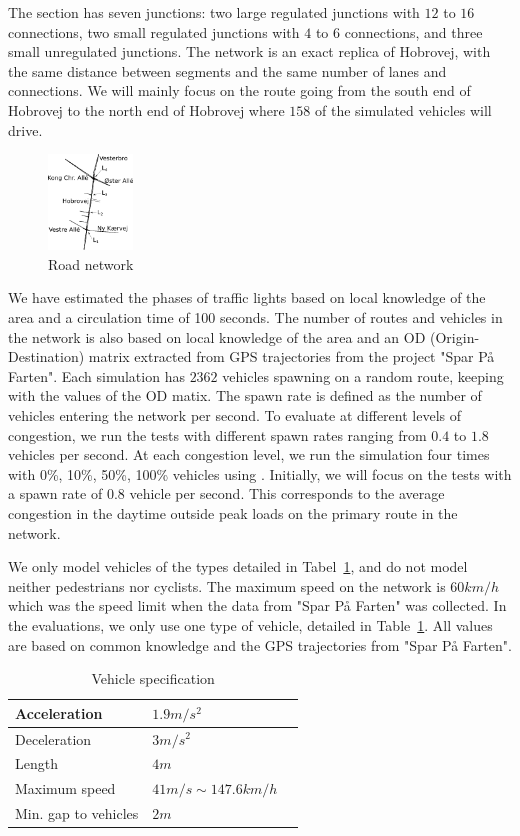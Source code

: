 The section has seven junctions: two large regulated junctions with $12$ to $16$ connections, two small regulated junctions with $4$ to $6$ connections, and three small unregulated junctions.
The network is an exact replica of Hobrovej, with the same distance between segments and the same number of lanes and connections.
We will mainly focus on the route going from the south end of Hobrovej to the north end of Hobrovej where $158$ of the simulated vehicles will drive.
\begin{figure}[htb]
\centering
\includegraphics[width=0.2\textwidth]{../images/HobrovejNy.png}
\caption{Road network}
\label{fig:Introduction:hobro}
\end{figure}

We have estimated the phases of traffic lights based on local knowledge of the area and a circulation time of 100 seconds.
The number of routes and vehicles in the network is also based on local knowledge of the area and an OD (Origin-Destination) matrix extracted from GPS trajectories from the project "Spar På Farten"\cite{SparPaFarten}.
Each simulation has $2362$ vehicles spawning on a random route, keeping with the values of the OD matix.
The spawn rate is defined as the number of vehicles entering the network per second.
To evaluate \tech at different levels of congestion, we run the tests with different spawn rates ranging from $0.4$ to $1.8$ vehicles per second.
At each congestion level, we run the simulation four times with 0\%, 10\%, 50\%, 100\% vehicles using \tech.
Initially, we will focus on the tests with a spawn rate of $0.8$ vehicle per second. %
This corresponds to the average congestion in the daytime outside peak loads on the primary route in the network.

We only model vehicles of the types detailed in Tabel~\ref{table.vehicleTypes}, and do not model neither pedestrians nor cyclists.
The maximum speed on the network is $60km/h$ which was the speed limit when the data from "Spar På Farten" was collected.
In the evaluations, we only use one type of vehicle, detailed in Table~\ref{table.vehicleTypes}. 
All values are based on common knowledge and the GPS trajectories from "Spar På Farten".

\begin{table}
\centering
\begin{tabular}{|l|l|l|}\hline
Acceleration			& $1.9 m/s^2$	\\\hline
Deceleration			& $3 m/s^2$ 	\\\hline
Length					& $4 m$ 		\\\hline
Maximum speed			& $41 m/s \sim 147.6 km/h$ \\\hline
Min. gap to vehicles	& $2 m$ 		\\\hline
\end{tabular}
\caption{Vehicle specification}\label{table.vehicleTypes}
\end{table}


